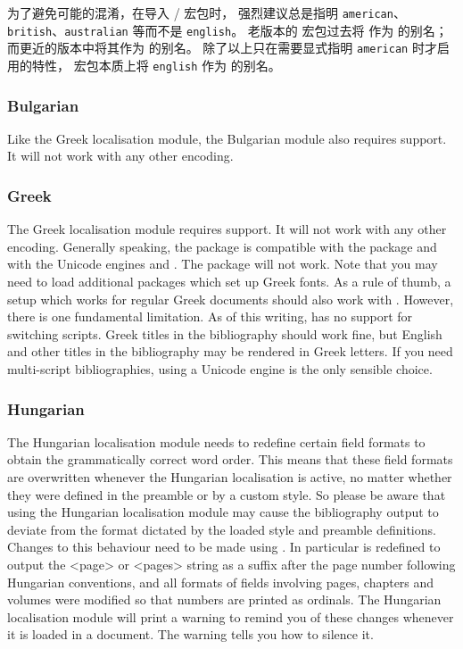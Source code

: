 为了避免可能的混淆，在导入 / 宏包时，
强烈建议总是指明 \texttt{american}、\texttt{british}、\texttt{australian} 等而不是 \texttt{english}。
老版本的  宏包过去将  作为  的别名；
而更近的版本中将其作为  的别名。
除了以上只在需要显式指明 \texttt{american} 时才启用的特性，
\biblatex 宏包本质上将 \texttt{english} 作为  的别名。

\subsubsection{Bulgarian}
\label{use:loc:bul}

Like the Greek localisation module, the Bulgarian module also requires \utf support. It will not work with any other encoding.

\subsubsection{Greek}
\label{use:loc:grk}

The Greek localisation module requires \utf support. It will not work with any other encoding. Generally speaking, the \biblatex package is compatible with the  package and with the Unicode engines \lualatex and \xelatex. The  package will not work. Note that you may need to load additional packages which set up Greek fonts. As a rule of thumb, a setup which works for regular Greek documents should also work with \biblatex. However, there is one fundamental limitation. As of this writing, \biblatex has no support for switching scripts. Greek titles in the bibliography should work fine, but English and other titles in the bibliography may be rendered in Greek letters. If you need multi-script bibliographies, using a Unicode engine is the only sensible choice.

\subsubsection{Hungarian}
\label{use:loc:hun}

The Hungarian localisation module needs to redefine certain field formats to obtain the grammatically correct word order. This means that these field formats are overwritten whenever the Hungarian localisation is active, no matter whether they were defined in the preamble or by a custom style. So please be aware that using the Hungarian localisation module may cause the bibliography output to deviate from the format dictated by the loaded style and preamble definitions. Changes to this behaviour need to be made using . In particular  is redefined to output the <page> or <pages> string as a suffix after the page number following Hungarian conventions, and all formats of fields involving pages, chapters and volumes were modified so that numbers are printed as ordinals. The Hungarian localisation module will print a warning to remind you of these changes whenever it is loaded in a document. The warning tells you how to silence it.

